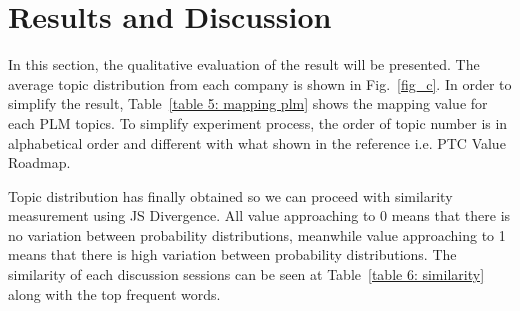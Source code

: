 \documentclass[conference]{IEEEtran}
\begin{document}
\section{Results and Discussion}
In this section, the qualitative evaluation of the result will be presented. The average topic distribution from each company is shown in Fig.~\ref{fig_c}. In order to simplify the result, Table~\ref{table 5: mapping plm} shows the mapping value for each PLM topics. To simplify experiment process, the order of topic number is in alphabetical order and different with what shown in the reference i.e. PTC Value Roadmap. 

Topic distribution has finally obtained so we can proceed with similarity measurement using JS Divergence. All value approaching to 0 means that there is no variation between probability distributions, meanwhile value approaching to 1 means that there is high variation between probability distributions. The similarity of each discussion sessions can be seen at Table~\ref{table 6: similarity} along with the top frequent words. 
\end{document}
